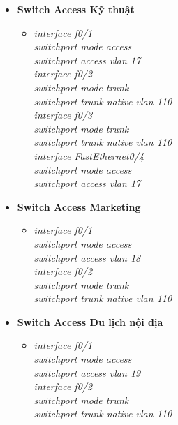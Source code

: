 \documentclass[a4paper, 12pt]{article}
\begin{document}
\begin{itemize}
\begin{itemize}
\begin{itemize}
    \end{itemize}
     \item \textbf{Switch Access  Kỹ thuật}
     \begin{itemize}
      \item \textit{interface f0/1\\
                    switchport mode access\\
                    switchport access vlan 17\\
                    interface f0/2\\
                    switchport mode trunk\\
                    switchport trunk native vlan 110\\
                    interface f0/3\\
                    switchport mode trunk\\
                    switchport trunk native vlan 110\\
                    interface FastEthernet0/4\\
                    switchport mode access\\
                     switchport access vlan 17\\}
     
    \end{itemize}
     \item \textbf{Switch Access  Marketing}
     \begin{itemize}
      \item \textit{interface f0/1\\
                    switchport mode access\\
                    switchport access vlan 18\\
                    interface f0/2\\
                    switchport mode trunk\\
                    switchport trunk native vlan 110\\}
     
    \end{itemize}
     \item \textbf{Switch Access  Du lịch nội địa}
     \begin{itemize}
      \item \textit{interface f0/1\\
                    switchport mode access\\
                    switchport access vlan 19\\
                    interface f0/2\\
                    switchport mode trunk\\
                    switchport trunk native vlan 110\\}
     

\end{itemize}
\end{itemize}
\end{itemize}
\end{document}
